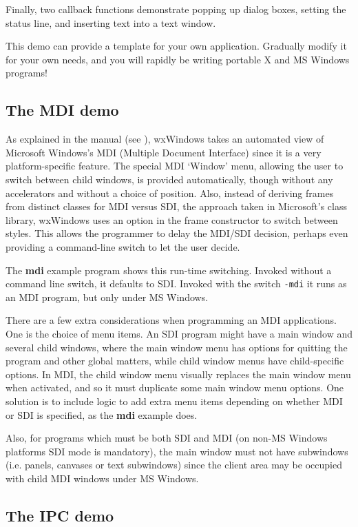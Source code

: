 Finally, two callback functions demonstrate popping up dialog boxes,
setting the status line, and inserting text into a text window.

This demo can provide a template for your own application.
Gradually modify it for your own needs, and you will rapidly be
writing portable X and MS Windows programs!

\subsection{The MDI demo}

As explained in the manual (see ), wxWindows takes an
automated view of Microsoft Windows's MDI (Multiple Document Interface)
since it is a very platform-specific feature. The special MDI `Window'
menu, allowing the user to switch between child windows, is provided
automatically, though without any accelerators and without a choice of
position. Also, instead of deriving frames from distinct classes for MDI
versus SDI, the approach taken in Microsoft's class library, wxWindows
uses an option in the frame constructor to switch between styles. This
allows the programmer to delay the MDI/SDI decision, perhaps even
providing a command-line switch to let the user decide.

The {\bf mdi} example program shows this run-time switching. Invoked
without a command line switch, it defaults to SDI. Invoked with the
switch {\tt -mdi} it runs as an MDI program, but only under MS Windows.

There are a few extra considerations when programming an MDI
applications. One is the choice of menu items. An SDI program might have
a main window and several child windows, where the main window menu has
options for quitting the program and other global matters, while child
window menus have child-specific options. In MDI, the child window menu
visually replaces the main window menu when activated, and so it must
duplicate some main window menu options. One solution is to
include logic to add extra menu items depending on whether MDI or
SDI is specified, as the {\bf mdi} example does.

Also, for programs which must be both SDI and MDI (on non-MS Windows
platforms SDI mode is mandatory), the main window must not have
subwindows (i.e. panels, canvases or text subwindows) since the client
area may be occupied with child MDI windows under MS Windows.

\subsection{The IPC demo}

